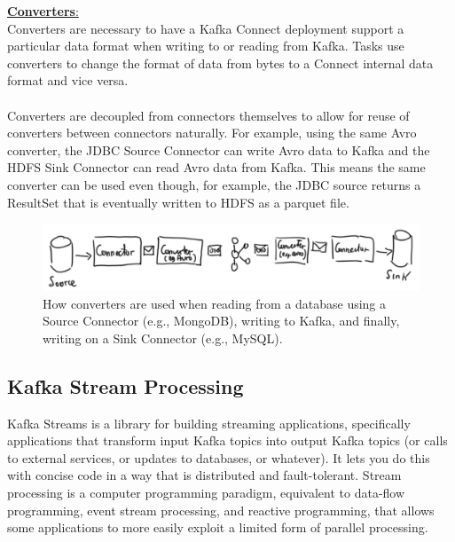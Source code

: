 \documentclass[10pt,a4paper]{article}
\newcommand{\nline}{\\~\\}
\begin{document}
\uline{\textbf{Converters}:} \\
Converters are necessary to have a Kafka Connect deployment support a particular data format when writing to or reading from Kafka. Tasks use converters to change the format of data from bytes to a Connect internal data format and vice versa. 
\nline
Converters are decoupled from connectors themselves to allow for reuse of converters between connectors naturally. For example, using the same Avro converter, the JDBC Source Connector can write Avro data to Kafka and the HDFS Sink Connector can read Avro data from Kafka. This means the same converter can be used even though, for example, the JDBC source returns a ResultSet that is eventually written to HDFS as a parquet file.
\begin{figure}[ht!]
 \hfill \includegraphics[width=400pt]{images/avro-converter}\hspace*{\fill}
 \caption{How converters are used when reading from a database using a Source Connector (e.g., MongoDB), writing to Kafka, and finally, writing on a Sink Connector (e.g., MySQL).}
\end{figure} 
\subsection{Kafka Stream Processing}
Kafka Streams is a library for building streaming applications, specifically applications that transform input Kafka topics into output Kafka topics (or calls to external services, or updates to databases, or whatever). It lets you do this with concise code in a way that is distributed and fault-tolerant. Stream processing is a computer programming paradigm, equivalent to data-flow programming, event stream processing, and reactive programming, that allows some applications to more easily exploit a limited form of parallel processing.
\end{document}

